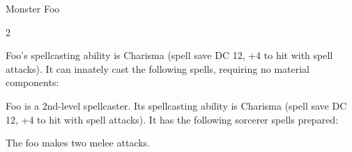 \begin{DndMonster}[float*=b,width=\textwidth + 8pt]{Monster Foo}
  \begin{multicols}{2}

    \DndMonsterBasics[
        armor-class = {9 (12 with \emph{mage armor})},
        hit-points  = {\DndDice{3d8 + 3}},
        speed       = {30 ft., fly 30 ft.},
      ]

    \DndMonsterAbilityScores[
        str = 12,
        dex = 8,
        con = 13,
        int = 10,
        wis = 14,
        cha = 15,
      ]

    \DndMonsterDetails[
        senses = {darkvision 60 ft., passive Perception 10},
        languages = {Common, Goblin, Undercommon},
        challenge = 1,
      ]
    Foo's spellcasting ability is Charisma (spell save DC 12, +4 to hit with spell attacks). It can innately cast the following spells, requiring no material components:
    \begin{DndMonsterSpells}
    \end{DndMonsterSpells}

    Foo is a 2nd-level spellcaster. Its spellcasting ability is Charisma (spell save DC 12, +4 to hit with spell attacks). It has the following sorcerer spells prepared:
    \begin{DndMonsterSpells}
    \end{DndMonsterSpells}

    The foo makes two melee attacks.


\end{multicols}
\end{DndMonster}
